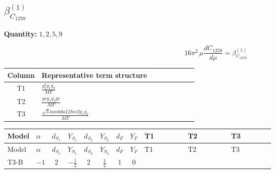 \documentclass[8pt]{article}
\begin{document}
\begin{landscape}
\section*{$\beta_{C_{1259}}^{(1)}$}
\noindent\textbf{Quantity: }$\mathrm{1,2,5,9}$\par\smallskip
\[16\pi^2\,\mu\frac{d C_{1259}}{d\mu}=\beta_{C_{1259}}^{(1)}\]
\begin{center}
\begin{tabular}{@{}c >{\raggedright\arraybackslash}p{0.82\linewidth}@{}}
\toprule
Column & Representative term structure \\
\midrule
T1 & \(\displaystyle \frac{g_{2}^{2} \overline{y_{1}} \overline{y_{2}}}{MF}\) \\
\midrule
T2 & \(\displaystyle \frac{ye \overline{y_{1}} \overline{y_{2}} \overline{ye}}{MF}\) \\
\midrule
T3 & \(\displaystyle \frac{\sqrt{3} lambda12Inv2 \overline{y_{1}} \overline{y_{2}}}{MF}\) \\
\midrule
\bottomrule
\end{tabular}
\end{center}
\smallskip
\tiny
\begin{longtable}{@{}llcccccc >{\raggedright\arraybackslash}p{0.21\linewidth} >{\raggedright\arraybackslash}p{0.21\linewidth} >{\raggedright\arraybackslash}p{0.21\linewidth}@{}}
\toprule
Model & $\alpha$ & $d_{S_1}$ & $Y_{S_1}$ & $d_{S_2}$ & $Y_{S_2}$ & $d_F$ & $Y_F$ & T1 & T2 & T3 \\
\midrule
\endfirsthead
\toprule
Model & $\alpha$ & $d_{S_1}$ & $Y_{S_1}$ & $d_{S_2}$ & $Y_{S_2}$ & $d_F$ & $Y_F$ & T1 & T2 & T3 \\
\midrule
\endhead
T3-B & $-1$ & $2$ & $-\frac{1}{2}$ & $2$ & $\frac{1}{2}$ & $1$ & $0$ & \scriptsize\adjustbox{max width=\linewidth}{$\begin{gathered} \frac{3 g_{2}^{2} \overline{y_{1}} \overline{y_{2}}}{8 MF}\end{gathered}$} & \scriptsize\adjustbox{max width=\linewidth}{$\begin{gathered} - \frac{ye \overline{y_{1}} \overline{y_{2}} \overline{ye}}{8 MF}\end{gathered}$} & \scriptsize\adjustbox{max width=\linewidth}{$\begin{gathered} \frac{\sqrt{3} lambda12Inv2 \overline{y_{1}} \overline{y_{2}}}{6 MF}\end{gathered}$} \\
\midrule
\bottomrule
\end{longtable}
\clearpage

\end{landscape}
\end{document}
